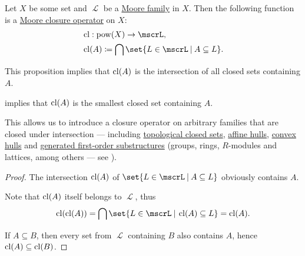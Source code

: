 \begin{proposition}\label{thm:closure_operator_from_set_semilattice}
  Let \( X \) be some set and \( \mscrL \) be a \hyperref[def:moore_family]{Moore family} in \( X \). Then the following function is a \hyperref[def:moore_closure_operator]{Moore closure operator} on \( X \):
  \begin{equation*}
    \begin{aligned}
      &\cl: \pow(X) \to \mscrL, \\
      &\cl(A) \coloneqq \bigcap \set{ L \in \mscrL \given A \subseteq L }. \\
    \end{aligned}
  \end{equation*}
\end{proposition}
\begin{comments}
  \item This proposition implies that \( \operatorname{cl}(A) \) is the intersection of all closed sets containing \( A \).
  \item {} implies that \( \operatorname{cl}(A) \) is the smallest closed set containing \( A \).
  \item This allows us to introduce a closure operator on arbitrary families that are closed under intersection --- including \hyperref[def:topological_space]{topological closed sets}, \hyperref[def:affine_hull]{affine hulls}, \hyperref[def:convex_hull]{convex hulls} and \hyperref[def:first_order_generated_substructure]{generated first-order substructures} (groups, rings, \( R \)-modules and lattices, among others --- see ).
\end{comments}
\begin{proof}
   The intersection \( \operatorname{cl}(A) \) of \( \set{ L \in \mscrL \given A \subseteq L } \) obviously contains \( A \).

   Note that \( \operatorname{cl}(A) \) itself belongs to \( \mscrL \), thus
  \begin{equation*}
    \cl(\cl(A)) = \bigcap \set{ L \in \mscrL \given \cl(A) \subseteq L } = \cl(A).
  \end{equation*}

   If \( A \subseteq B \), then every set from \( \mscrL \) containing \( B \) also contains \( A \), hence \( \operatorname{cl}(A) \subseteq \operatorname{cl}(B) \).
\end{proof}

